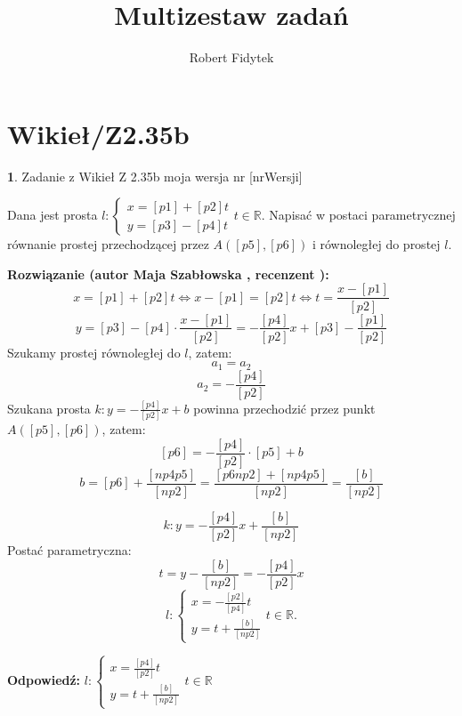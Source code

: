 \documentclass[12pt, a4paper]{article}
\title{Multizestaw zadań}
\author{Robert Fidytek}
\date{}
\theoremstyle{definition} %
\newtheorem{zad}{}
\newcommand{\kategoria}[1]{\section{#1}} %
\newcommand{\zadStart}[1]{\begin{zad}#1\newline} %
\newcommand{\zadStop}{\end{zad}}   %
\newcommand{\rozwStart}[2]{\noindent \textbf{Rozwiązanie (autor #1 , recenzent #2): }\newline} %
\newcommand{\rozwStop}{\newline}                                            %
\newcommand{\odpStart}{\noindent \textbf{Odpowiedź:}\newline}    %
\newcommand{\odpStop}{\newline}                                             %
\begin{document}
\maketitle


\kategoria{Wikieł/Z2.35b}
\zadStart{Zadanie z Wikieł Z 2.35b moja wersja nr [nrWersji]}

Dana jest prosta $l:\left\{ \begin{array}{ll}
x=[p1]+[p2]t \\
y=[p3]-[p4]t  
\end{array}\right.  t\in\mathbb{R}.$ Napisać w postaci parametrycznej równanie prostej przechodzącej przez $A([p5],[p6])$ i równoległej do prostej $l.$
\zadStop

\rozwStart{Maja Szabłowska}{}
$$x=[p1]+[p2]t \iff x-[p1]=[p2]t \iff t=\frac{x-[p1]}{[p2]}$$
$$ y=[p3]-[p4]\cdot\frac{x-[p1]}{[p2]}=-\frac{[p4]}{[p2]}x+[p3]-\frac{[p1]}{[p2]}$$
Szukamy prostej równoległej do $l$, zatem:
$$a_{1}=a_{2}$$
$$a_{2}=-\frac{[p4]}{[p2]}$$
Szukana prosta $k: y=-\frac{[p4]}{[p2]}x+b$ powinna przechodzić przez punkt $A([p5],[p6])$, zatem:
$$[p6]=-\frac{[p4]}{[p2]}\cdot[p5]+b$$
$$b=[p6]+\frac{[np4p5]}{[np2]}=\frac{[p6np2]+[np4p5]}{[np2]}=\frac{[b]}{[np2]}$$

$$k: y=-\frac{[p4]}{[p2]}x+\frac{[b]}{[np2]}$$
Postać parametryczna:
$$t=y-\frac{[b]}{[np2]}=-\frac{[p4]}{[p2]}x$$
$$l:\left\{ \begin{array}{ll}
x=-\frac{[p2]}{[p4]}t\\
y=t+\frac{[b]}{[np2]}
\end{array}\right.  t\in\mathbb{R}.$$
\rozwStop


\odpStart
$l:\left\{ \begin{array}{ll}
x=\frac{[p4]}{[p2]}t\\
y=t+\frac{[b]}{[np2]}
\end{array}\right.  t\in\mathbb{R}$
\odpStop
\end{document}
